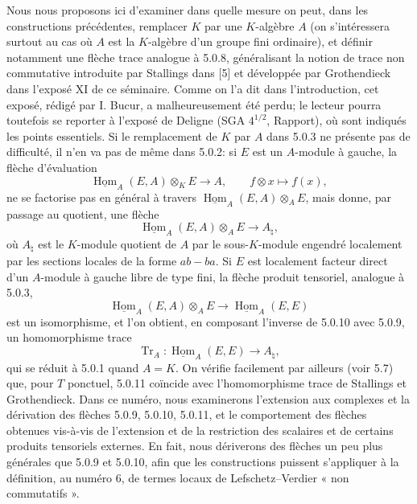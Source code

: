\documentclass[11pt]{article}
\DeclareMathOperator{\Hom}{Hom}
\providecommand{\uHom}{\underline{\Hom}}
\providecommand{\Tr}{\operatorname{Tr}}
\providecommand{\Tr}{\operatorname{Tr}}
\providecommand{\Tr}{\operatorname{Tr}}
\providecommand{\Hom}{\operatorname{Hom}}
\providecommand{\Tr}{\operatorname{Tr}}
\providecommand{\Hom}{\operatorname{Hom}}
\providecommand{\Tr}{\operatorname{Tr}}
\begin{document}
Nous nous proposons ici d'examiner dans quelle mesure on peut, dans les constructions précédentes, remplacer $K$ par une $K$-algèbre $A$ (on s'intéressera surtout au cas où $A$ est la $K$-algèbre d'un groupe fini ordinaire), et définir notamment une flèche trace analogue à 5.0.8, généralisant la notion de trace non commutative introduite par Stallings dans [5] et développée par Grothendieck dans l'exposé XI de ce séminaire. Comme on l'a dit dans l'introduction, cet exposé, rédigé par I. Bucur, a malheureusement été perdu; le lecteur pourra toutefois se reporter à l'exposé de Deligne (SGA $4^{1/2}$, Rapport), où sont indiqués les points essentiels. Si le remplacement de $K$ par $A$ dans 5.0.3 ne présente pas de difficulté, il n'en va pas de même dans 5.0.2: si $E$ est un $A$-module à gauche, la flèche d'évaluation
\[
\uHom_A(E,A)\otimes_KE\longrightarrow A,
\qquad f\otimes x\longmapsto f(x),
\]
ne se factorise pas en général à travers $\uHom_A(E,A)\otimes_AE$, mais donne, par passage au quotient, une flèche
\begin{equation}\tag{5.0.9}
\uHom_A(E,A)\otimes_AE\longrightarrow A_\natural,
\end{equation}
où $A_\natural$ est le $K$-module quotient de $A$ par le sous-$K$-module engendré localement par les sections locales de la forme $ab-ba$. Si $E$ est localement facteur direct d'un $A$-module à gauche libre de type fini, la flèche produit tensoriel, analogue à 5.0.3,
\begin{equation}\tag{5.0.10}
\uHom_A(E,A)\otimes_AE\longrightarrow\uHom_A(E,E)
\end{equation}
est un isomorphisme, et l'on obtient, en composant l'inverse de 5.0.10 avec 5.0.9, un homomorphisme trace
\begin{equation}\tag{5.0.11}
\Tr_A:\uHom_A(E,E)\longrightarrow A_\natural,
\end{equation}
qui se réduit à 5.0.1 quand $A=K$. On vérifie facilement par ailleurs (voir 5.7) que, pour $T$ ponctuel, 5.0.11 coïncide avec l'homomorphisme trace de Stallings et Grothendieck. Dans ce numéro, nous examinerons l'extension aux complexes et la dérivation des flèches 5.0.9, 5.0.10, 5.0.11, et le comportement des flèches obtenues vis-à-vis de l'extension et de la restriction des scalaires et de certains produits tensoriels externes. En fait, nous dériverons des flèches un peu plus générales que 5.0.9 et 5.0.10, afin que les constructions puissent s'appliquer à la définition, au numéro 6, de termes locaux de Lefschetz--Verdier « non commutatifs ».
\end{document}
